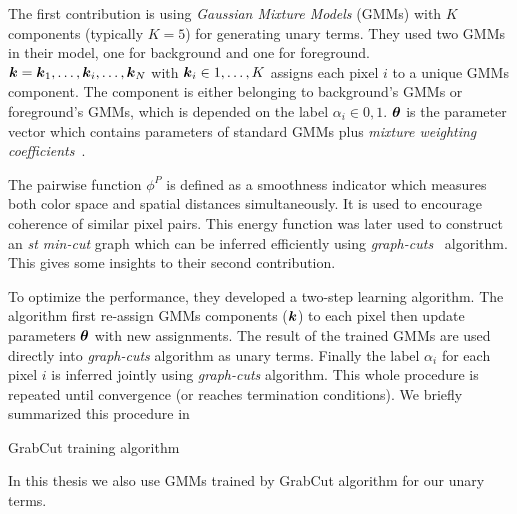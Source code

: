The first contribution is using \emph{Gaussian Mixture Models}
(GMMs) with $K$ components (typically $K=5$) for generating unary
terms. They used two GMMs in their model, one for background and
one for foreground. ${\boldsymbol{k}}={{\boldsymbol{k}}_1,\dots,{\boldsymbol{k}}_i,\dots,{\boldsymbol{k}}_N}$ with
${\boldsymbol{k}}_i\in 1,\dots,K$ assigns each pixel $i$ to a unique GMMs
component. The component is either belonging to background's GMMs
or foreground's GMMs, which is depended on the label $\alpha_i\in
{0,1}$. $\boldsymbol{\theta}$ is the parameter vector which contains
parameters of standard GMMs plus \emph{mixture weighting
  coefficients}~\cite{Rother:SIGGRAPH04}.

The pairwise function $\phi^P$ is defined as a smoothness
indicator which measures both color space and spatial distances
simultaneously. It is used to encourage coherence of similar
pixel pairs. This energy function was later used to construct an
\emph{st min-cut} graph which can be inferred efficiently using
\emph{graph-cuts}~\cite{Boykov:ICCV01} algorithm. This gives some
insights to their second contribution.

To optimize the performance, they developed a two-step learning
algorithm. The algorithm first re-assign GMMs components (${\boldsymbol{k}}$)
to each pixel then update parameters $\boldsymbol{\theta}$ with new
assignments. The result of the trained GMMs are used directly
into \emph{graph-cuts} algorithm as unary terms. Finally the
label $\alpha_i$ for each pixel $i$ is inferred jointly using
\emph{graph-cuts} algorithm. This whole procedure is repeated
until convergence (or reaches termination conditions). We briefly
summarized this procedure in 

\begin{algorithm}[tb]
  \begin{algorithmic}[1]
    \REPEAT
  \end{algorithmic}
  \caption{\label{alg:grabcut} GrabCut training algorithm}
\end{algorithm}

In this thesis we also use GMMs trained by GrabCut algorithm for
our unary terms.


